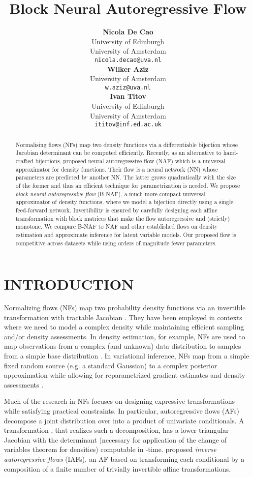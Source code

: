 \documentclass[letterpaper]{article}
\title{Block Neural Autoregressive Flow}
\author{ {\bf Nicola De Cao} \\
University of Edinburgh\\
University of Amsterdam\\
{\tt nicola.decao@uva.nl}\\
\And
{\bf Wilker Aziz} \\
University of Amsterdam\\
{\tt w.aziz@uva.nl} \\
\And
{\bf Ivan Titov} \\
University of Edinburgh\\
University of Amsterdam\\
{\tt ititov@inf.ed.ac.uk} \\
}
\begin{document}
\maketitle

\begin{abstract}
Normalising flows (NFs) map two density functions via a differentiable bijection whose Jacobian determinant can be computed efficiently. Recently, as an alternative to hand-crafted bijections, \citet{huang2018neural} proposed neural autoregressive flow (NAF) which is a universal approximator for density functions. Their flow is a neural network (NN) whose parameters are predicted by another NN. The latter grows quadratically with the size of the former and thus an efficient technique for parametrization is needed. We propose \emph{block neural autoregressive flow} (B-NAF), a much more compact universal approximator of density functions, where we model a bijection directly using a single feed-forward network. Invertibility is ensured by carefully designing each affine transformation with block matrices that make the flow autoregressive and (strictly) monotone. We compare B-NAF to NAF and other established flows on density estimation and approximate inference for latent variable models. Our proposed flow is competitive across datasets while using orders of magnitude fewer parameters.
\end{abstract}

\section{INTRODUCTION}
Normalizing flows (NFs) map two probability density functions via an invertible transformation with tractable Jacobian \citep{tabak2010density}. They have been employed in contexts where we need to model a complex density while maintaining efficient sampling and/or density assessments. In density estimation, for example, NFs are used to map observations from a complex (and unknown) data distribution to samples from a simple base distribution \citep{rippel2013high}. In variational inference, NFs map from a simple fixed random source (e.g. a standard Gaussian) to a complex posterior approximation while allowing for reparametrized gradient estimates and density assessments \citep{rezende2015variational}.

Much of the research in NFs focuses on designing expressive transformations while satisfying practical constraints. In particular, autoregressive flows (AFs) decompose a joint distribution over  into a product of  univariate conditionals. A transformation , that realizes such a decomposition, has a lower triangular Jacobian with the determinant (necessary for application of the change of variables theorem for densities) computable in -time. \citet{kingma2016improved} proposed \emph{inverse autoregressive flows} (IAFs), an AF based on transforming each conditional by a composition of a finite number of trivially invertible affine transformations.
\end{document}
